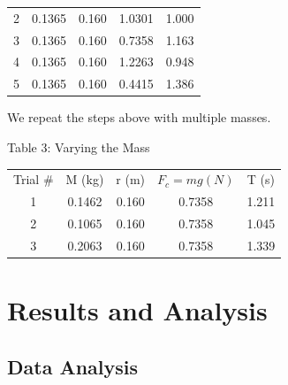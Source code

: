 \documentclass[12pt]{report}
\begin{document}
\begin{flushleft}
\begin{multicols}{2}
\begin{center}
\begin{tabular}{|c|c|c|c|c|}
2 & 0.1365 & 0.160 & 1.0301 & 1.000 \\
3 & 0.1365 & 0.160 & 0.7358 & 1.163 \\
4 & 0.1365 & 0.160 & 1.2263 & 0.948 \\
5 & 0.1365 & 0.160 & 0.4415 & 1.386 \\
\hline
\end{tabular}
\end{center}
We repeat the steps above with multiple masses.
\begin{center}
\flushleft Table 3: Varying the Mass
\footnotesize
\begin{tabular}{|c|c|c|c|c|}
\hline
Trial \# & M (kg) & r (m) & $F_c = mg (N)$ & T (s) \\
1 & 0.1462 & 0.160 & 0.7358 & 1.211 \\
2 & 0.1065 & 0.160 & 0.7358 & 1.045 \\
3 & 0.2063 & 0.160 & 0.7358 & 1.339 \\
\hline
\end{tabular}
\end{center}
\section{Results and Analysis}
\subsection{Data Analysis}


\end{multicols}
\end{flushleft}
\end{document}
